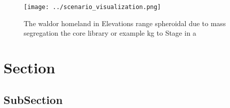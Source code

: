 \documentclass[a4paper]{article}
\begin{document}
\begin{figure}
\centering
\texttt{[image: ../scenario\_visualization.png]}
\caption{The waldor homeland in Elevations range spheroidal due to mass segregation the core library or example kg to Stage in a
}
\end{figure}
 
\section{Section}

\subsection{SubSection}
\end{document}

